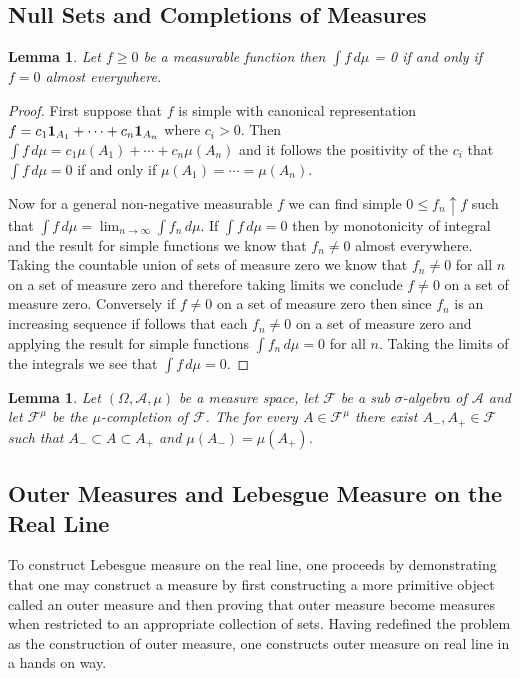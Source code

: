 \documentclass{amsart}
\newtheorem{lem}[thm]{Lemma}
\theoremstyle{remark}
\theoremstyle{definition}
\begin{document}
\subsection{Null Sets and Completions of Measures}
\begin{lem}Let $f \geq 0$ be a measurable function then $\int f \,
  d\mu$ = 0 if and only if $f = 0$ almost everywhere.
\end{lem}
\begin{proof}
First suppose that $f$ is simple with canonical representation $f = c_1
\textbf{1}_{A_1} + \dotsb +  c_n
\textbf{1}_{A_n}$ where $c_i > 0$.  Then $\int f \, d\mu = c_1
\mu(A_1) + \dotsb +  c_n
\mu(A_n)$ and it follows the positivity of the $c_i$ that $\int f \, d\mu =0$ if and only if
$\mu(A_1) = \dotsb = \mu(A_n)$.

Now for a general non-negative measurable $f$ we can find simple $0
\leq f_n \uparrow f$ such that $\int f \, d\mu = \lim_{n \to \infty}
\int f_n \, d\mu$.  If $\int f\, d\mu = 0$ then by monotonicity of
integral and the result for simple functions we know that $f_n \neq 0$
almost everywhere.  Taking the countable union of sets of measure zero we know
that $f_n \neq 0$ for all $n$ on a set of measure zero and therefore
taking limits we conclude $f \neq 0$ on a set of measure zero.
Conversely if $f \neq 0$ on a set of measure zero then since $f_n$ is
an increasing sequence if follows that each $f_n \neq 0$ on a set of
measure zero and applying the result for simple functions $\int f_n \,
d\mu =0$ for all $n$.  Taking the limits of the integrals we see that
$\int f \, d\mu =0$.
\end{proof}

\begin{lem}Let $(\Omega, \mathcal{A}, \mu)$ be a measure space, let
  $\mathcal{F}$ be a sub $\sigma$-algebra of $\mathcal{A}$ and let
  $\mathcal{F}^{\mu}$ be the $\mu$-completion of $\mathcal{F}$.  The
  for every $A \in \mathcal{F}^{\mu}$ there exist $A_-, A_+ \in
  \mathcal{F}$ such that $A_- \subset A \subset A_+$ and $\mu(A_-) = \mu(A_+)$.
\end{lem}

\subsection{Outer Measures and Lebesgue Measure on the Real Line}
To construct Lebesgue measure on the real line, one proceeds by
demonstrating that one may construct a measure by first constructing a more
primitive object called an outer measure and then proving that outer
measure become measures when restricted to an appropriate collection
of sets.  Having redefined the problem as the construction of outer
measure, one constructs outer measure on real line in a hands on way.
\end{document}
